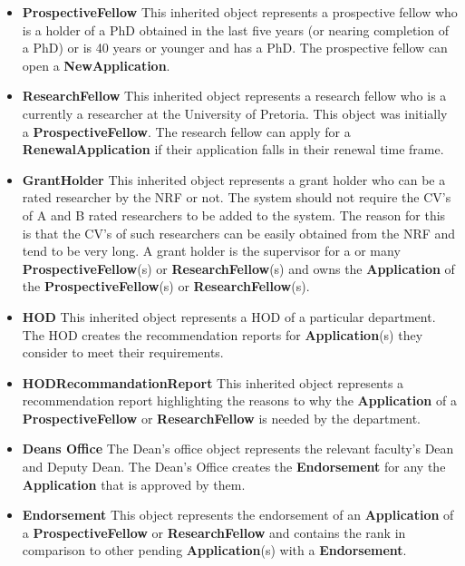 \documentclass[12pt]{article}
\begin{document}
\begin{itemize}
\item \textbf{ProspectiveFellow}
This inherited object represents a prospective fellow who is a holder of a PhD obtained in the last five years (or nearing completion of a PhD) or is 40 years or younger and has a PhD. The prospective fellow can open a \textbf{NewApplication}.

\item \textbf{ResearchFellow}
This inherited object represents a research fellow who is a currently a researcher at the University of Pretoria. This object was initially a \textbf{ProspectiveFellow}. The research fellow can apply for a \textbf{RenewalApplication} if their application falls in their renewal time frame.

\item \textbf{GrantHolder}
This inherited object represents a grant holder who can be a rated researcher by the NRF or not. The system should not require the CV's of A and B rated researchers to be added to the system. The reason for this is that the CV's of such researchers can be easily obtained from the NRF and tend to be very long. A grant holder is the supervisor for a or many \textbf{ProspectiveFellow}(s) or \textbf{ResearchFellow}(s) and owns the \textbf{Application} of the \textbf{ProspectiveFellow}(s) or \textbf{ResearchFellow}(s).

\item \textbf{HOD}
This inherited object represents a HOD of a particular department. The HOD creates the recommendation reports for \textbf{Application}(s) they consider to meet their requirements.\\

\item \textbf{HODRecommandationReport}
This inherited object represents a recommendation report highlighting the reasons to why the \textbf{Application} of a \textbf{ProspectiveFellow} or \textbf{ResearchFellow} is needed by the department.

\item \textbf{Deans Office}
The Dean's office object represents the relevant faculty's Dean and Deputy Dean. The Dean's Office creates the \textbf{Endorsement} for any the \textbf{Application} that is approved by them.

\item \textbf{Endorsement}
This object represents the endorsement of an \textbf{Application} of a \textbf{ProspectiveFellow} or \textbf{ResearchFellow} and contains the rank in comparison to other pending \textbf{Application}(s) with a \textbf{Endorsement}.


\end{itemize}
\end{document}
